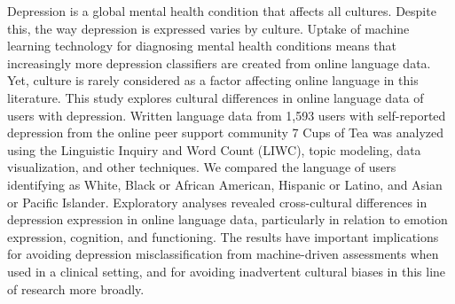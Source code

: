 Depression is a global mental health condition that affects all cultures. Despite this, the way depression is expressed varies by culture. Uptake of machine learning technology for diagnosing mental health conditions means that increasingly more depression classifiers are created from online language data. Yet, culture is rarely considered as a factor affecting online language in this literature. This study explores cultural differences in online language data of users with depression. Written language data from 1,593 users with self-reported depression from the online peer support community 7 Cups of Tea was analyzed using the Linguistic Inquiry and Word Count (LIWC), topic modeling, data visualization, and other techniques. We compared the language of users identifying as White, Black or African American, Hispanic or Latino, and Asian or Pacific Islander. Exploratory analyses revealed cross-cultural differences in depression expression in online language data, particularly in relation to emotion expression, cognition, and functioning. The results have important implications for avoiding depression misclassification from machine-driven assessments when used in a clinical setting, and for avoiding inadvertent cultural biases in this line of research more broadly.
